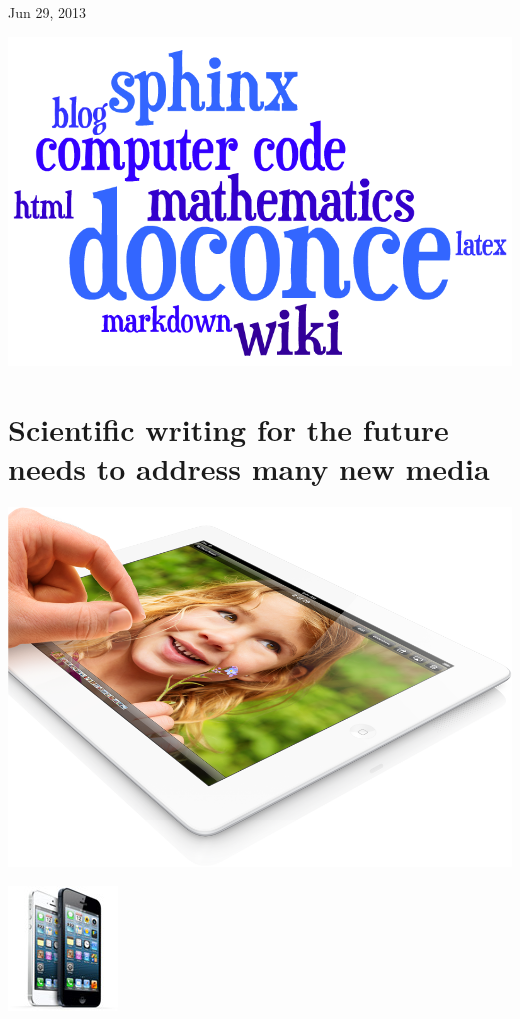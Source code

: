 \documentclass[%
oneside,                 %
final,                   %
chapterprefix=true,      %
open=right               %
10pt]{book}
\begin{document}
\vfill
\clearpage

\begin{center}
Jun 29, 2013
\end{center}

\vspace{1cm}



\begin{center}  %
  \centerline{\includegraphics[width=0.5\linewidth]{../doc/slides/fig/doconce1b.png}}
\end{center}


\section{Scientific writing for the future needs to address many new media}


\begin{center}  %
  \centerline{\includegraphics[width=0.8\linewidth]{../doc/slides/fig/ipad.png}}
\end{center}



\begin{center}  %
  \centerline{\includegraphics[width=0.3\linewidth]{../doc/slides/fig/iphones.jpg}}
\end{center}
\end{document}
